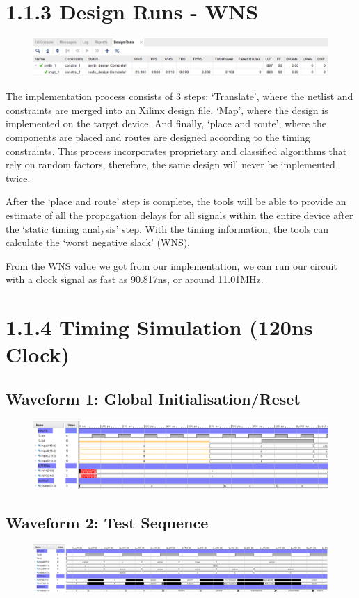 \documentclass[11pt]{report}
\begin{document}
\section*{1.1.3 Design Runs - WNS}
\begin{figure}[H]
    \includegraphics[width=\columnwidth]{Waveforms/design_runs-WNS.png}
\end{figure}
The implementation process consists of 3 steps: `Translate', where the netlist and constraints are merged into an Xilinx design file. `Map', where the design is implemented on the target device. And finally, `place and route', where the components are placed and routes are designed according to the timing constraints. This process incorporates proprietary and classified algorithms that rely on random factors, therefore, the same design will never be implemented twice.

After the `place and route' step is complete, the tools will be able to provide an estimate of all the propagation delays for all signals within the entire device after the `static timing analysis' step. With the timing information, the tools can calculate the `worst negative slack' (WNS).

From the WNS value we got from our implementation, we can run our circuit with a clock signal as fast as 90.817ns, or around 11.01MHz.


\section*{1.1.4 Timing Simulation (120ns Clock)}
\subsection*{Waveform 1: Global Initialisation/Reset}
\begin{figure}[H]
    \includegraphics[width=\columnwidth]{Waveforms/120ns_timing_sim-global-reset.png}
\end{figure}
\subsection*{Waveform 2: Test Sequence}
\begin{figure}[H]
    \includegraphics[width=\columnwidth]{Waveforms/120ns_timing_sim-test-sequence.png}
\end{figure}
\end{document}
